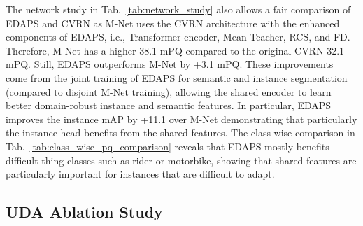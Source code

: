 \documentclass[10pt,twocolumn,letterpaper]{article}
\begin{document}
The network study in Tab.~\ref{tab:network_study} also allows a fair comparison of EDAPS and CVRN as M-Net uses the
CVRN architecture with the enhanced components of EDAPS, i.e., Transformer encoder, Mean Teacher, RCS, and FD. Therefore, M-Net has a higher 38.1 mPQ compared to the original CVRN 32.1 mPQ. Still, EDAPS outperforms M-Net by +3.1 mPQ. These improvements come from the joint training of EDAPS for semantic and instance segmentation (compared to disjoint M-Net training), allowing the shared encoder to learn better domain-robust instance and semantic features. In particular, EDAPS improves the instance mAP by +11.1 over M-Net demonstrating that particularly the instance head benefits from the shared features. The class-wise comparison in Tab.~\ref{tab:class_wise_pq_comparison} reveals that EDAPS mostly benefits difficult thing-classes such as rider or motorbike, showing that shared features are particularly important for instances that are difficult to adapt.


\subsection{UDA Ablation Study}
\end{document}
